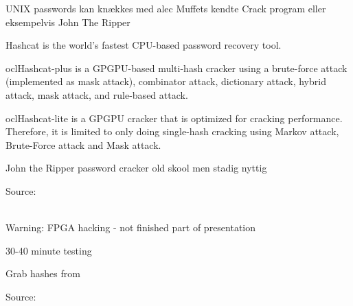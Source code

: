 \documentclass[20pt,landscape,a4paper,footrule]{foils}
\begin{document}
\begin{list1}
\item UNIX passwords kan knækkes med alec Muffets kendte Crack program
  eller eksempelvis John The Ripper 
\end{list1}




\begin{list2}
\item Hashcat is the world's fastest CPU-based password recovery tool.
\item oclHashcat-plus is a GPGPU-based multi-hash cracker using a brute-force attack (implemented as mask attack), combinator attack, dictionary attack, hybrid attack, mask attack, and rule-based attack.
\item oclHashcat-lite is a GPGPU cracker that is optimized for cracking performance. Therefore, it is limited to only doing single-hash cracking using Markov attack, Brute-Force attack and Mask attack.
\item John the Ripper password cracker old skool men stadig nyttig
\end{list2}

Source:\\
\\





Warning: FPGA hacking - not finished part of presentation





30-40 minute testing

Grab hashes from 




Source:
\end{document}
